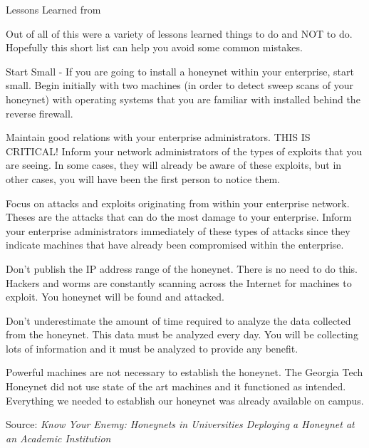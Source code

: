 \documentclass[Screen16to9,17pt]{foils}
\begin{document}
\begin{list2}
\item Lessons Learned from 
\item Out of all of this were a variety of lessons learned things to do and NOT to do. Hopefully this short list can help you avoid some common mistakes.

\item Start Small - If you are going to install a honeynet within your enterprise, start small. Begin initially with two machines (in order to detect sweep scans of your honeynet) with operating systems that you are familiar with installed behind the reverse firewall.
\item Maintain good relations with your enterprise administrators. THIS IS CRITICAL! Inform your network administrators of the types of exploits that you are seeing. In some cases, they will already be aware of these exploits, but in other cases, you will have been the first person to notice them.
\item Focus on attacks and exploits originating from within your enterprise network. Theses are the attacks that can do the most damage to your enterprise. Inform your enterprise administrators immediately of these types of attacks since they indicate machines that have already been compromised within the enterprise.
\item Don't publish the IP address range of the honeynet. There is no need to do this. Hackers and worms are constantly scanning across the Internet for machines to exploit. You honeynet will be found and attacked.
\item Don't underestimate the amount of time required to analyze the data collected from the honeynet. This data must be analyzed every day. You will be collecting lots of information and it must be analyzed to provide any benefit.
\item Powerful machines are not necessary to establish the honeynet. The Georgia Tech Honeynet did not use state of the art machines and it functioned as intended. Everything we needed to establish our honeynet was already available on campus.
\end{list2}

Source: \emph{Know Your Enemy: Honeynets in Universities Deploying a Honeynet at an Academic Institution}


\end{document}
